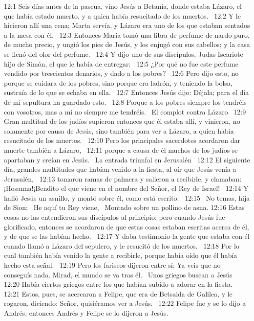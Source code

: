 12:1 Seis días antes de la pascua, vino Jesús a Betania, donde estaba Lázaro, el que había estado muerto, y a quien había resucitado de los muertos.  
12:2 Y le hicieron allí una cena; Marta servía, y Lázaro era uno de los que estaban sentados a la mesa con él.  
12:3 Entonces María tomó una libra de perfume de nardo puro, de mucho precio, y ungió los pies de Jesús, y los enjugó con sus cabellos; y la casa se llenó del olor del perfume.  
12:4 Y dijo uno de sus discípulos, Judas Iscariote hijo de Simón, el que le había de entregar:  
12:5 ¿Por qué no fue este perfume vendido por trescientos denarios, y dado a los pobres?  
12:6 Pero dijo esto, no porque se cuidara de los pobres, sino porque era ladrón, y teniendo la bolsa, sustraía de lo que se echaba en ella.  
12:7 Entonces Jesús dijo: Déjala; para el día de mi sepultura ha guardado esto.  
12:8 Porque a los pobres siempre los tendréis con vosotros, mas a mí no siempre me tendréis.  
El complot contra Lázaro  
12:9 Gran multitud de los judíos supieron entonces que él estaba allí, y vinieron, no solamente por causa de Jesús, sino también para ver a Lázaro, a quien había resucitado de los muertos.  
12:10 Pero los principales sacerdotes acordaron dar muerte también a Lázaro,  
12:11 porque a causa de él muchos de los judíos se apartaban y creían en Jesús.  
La entrada triunfal en Jerusalén   
12:12 El siguiente día, grandes multitudes que habían venido a la fiesta, al oír que Jesús venía a Jerusalén,  
12:13 tomaron ramas de palmera y salieron a recibirle, y clamaban: ¡Hosanna!¡Bendito el que viene en el nombre del Señor, el Rey de Israel!  
12:14 Y halló Jesús un asnillo, y montó sobre él, como está escrito:  
12:15  No temas, hija de Sion;  
He aquí tu Rey viene,  
Montado sobre un pollino de asna. 
12:16 Estas cosas no las entendieron sus discípulos al principio; pero cuando Jesús fue glorificado, entonces se acordaron de que estas cosas estaban escritas acerca de él, y de que se las habían hecho.  
12:17 Y daba testimonio la gente que estaba con él cuando llamó a Lázaro del sepulcro, y le resucitó de los muertos.  
12:18 Por lo cual también había venido la gente a recibirle, porque había oído que él había hecho esta señal.  
12:19 Pero los fariseos dijeron entre sí: Ya veis que no conseguís nada. Mirad, el mundo se va tras él.  
Unos griegos buscan a Jesús  
12:20 Había ciertos griegos entre los que habían subido a adorar en la fiesta.  
12:21 Estos, pues, se acercaron a Felipe, que era de Betsaida de Galilea, y le rogaron, diciendo: Señor, quisiéramos ver a Jesús.  
12:22 Felipe fue y se lo dijo a Andrés; entonces Andrés y Felipe se lo dijeron a Jesús.  

